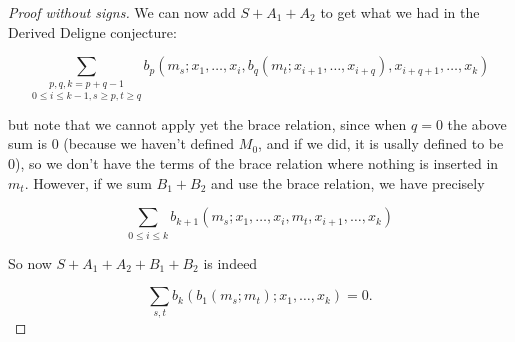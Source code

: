 \documentclass[twoside]{article}
\begin{document}
\begin{proof}[Proof without signs]
We can now add $S+A_1+A_2$ to get what we had in the Derived Deligne conjecture:

$$\underset{0\leq i\leq k-1,s\geq p,t\geq q}{\sum_{p,q,k=p+q-1}}b_p(m_s;x_1,\dots, x_i,b_q(m_t;x_{i+1},\dots, x_{i+q}),x_{i+q+1},\dots, x_k)$$

but note that we cannot apply yet the brace relation, since when $q=0$ the above sum is 0 (because we haven't defined $M_0$, and if we did, it is usally defined to be 0), so we don't have the terms of the brace relation where nothing is inserted in $m_t$. However, if we sum $B_1+B_2$ and use the brace relation, we have precisely

$$\sum_{0\leq i\leq k}b_{k+1}(m_s;x_1,\dots, x_i,m_t,x_{i+1},\dots, x_k)$$

So now $S+A_1+A_2+B_1+B_2$ is indeed

$$\sum_{s,t}b_k(b_1(m_s;m_t);x_1,\dots, x_k)=0.$$
\end{proof}
\end{document}
